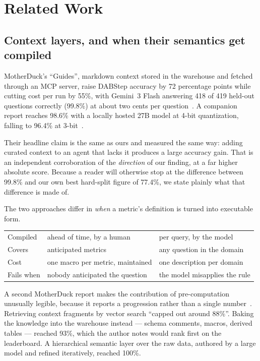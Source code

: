 \section{Related Work}
\label{sec:related}

\subsection{Context layers, and when their semantics get compiled}

MotherDuck's ``Guides'', markdown context stored in the warehouse and fetched
through an MCP server, raise DABStep accuracy by 72 percentage
points while cutting cost per run by 55\%, with Gemini~3 Flash answering 418 of
419 held-out questions correctly (99.8\%) at about two cents per
question~\cite{motherduck-guides}. A companion report reaches 98.6\% with a
locally hosted 27B model at 4-bit quantization, falling to 96.4\% at
3-bit~\cite{motherduck-local}.

Their headline claim is the same as ours and measured the same way: adding
curated context to an agent that lacks it produces a large accuracy gain. That
is an independent corroboration of the \emph{direction} of our finding, at a
far higher absolute score. Because a reader will otherwise stop at the
difference between 99.8\% and our own best hard-split figure of 77.4\%, we
state plainly what that difference is made of.

The two approaches differ in \emph{when} a metric's definition is turned into
executable form.

\begin{center}
\small
\begin{tabular}{@{}L{0.29\columnwidth}L{0.21\columnwidth}L{0.29\columnwidth}@{}}
\toprule
 &  &  \\
\midrule
Compiled & ahead of time, by a human & per query, by the model \\
Covers & anticipated metrics & any question in the domain \\
Cost & one macro per metric, maintained & one description per domain \\
Fails when & nobody anticipated the question & the model misapplies the rule \\
\bottomrule
\end{tabular}
\end{center}

A second MotherDuck report makes the contribution of pre-computation unusually
legible, because it reports a progression rather than a single
number~\cite{motherduck-semantic}. Retrieving context fragments by vector
search ``capped out around 88\%''. Baking the knowledge into the
warehouse instead --- schema comments, macros, derived tables --- reached 93\%,
which the author notes would rank first on the leaderboard. A hierarchical
semantic layer over the raw data, authored by a large model and refined
iteratively, reached 100\%.

